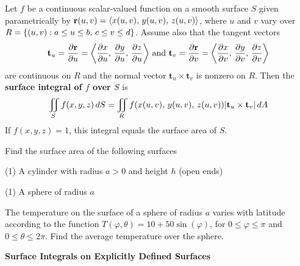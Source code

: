 \documentclass[../mathNotesPreamble]{subfiles}
\begin{document}
  \begin{defn*}
    Let $f$ be a continuous scalar-valued function on a smooth surface $S$ given parametrically by ${\mathbf{r}}(u,v)={\left\langle x(u,v),\,y(u,v),\,z(u,v) \right\rangle}$, where $u$ and $v$ vary over \newline$R={\left\{(u,v): a\leq u\leq b,\, c\leq v\leq d\right\}}$. Assume also that the tangent vectors \newline
      \[\displaystyle \mathbf t_u=\frac{\partial {\mathbf{r}}}{\partial u}={\left\langle \frac{\partial x}{\partial u},\, \frac{\partial y}{\partial u},\, \frac{\partial z}{\partial u} \right\rangle}
      \textnormal{ and }
      \displaystyle\mathbf t_v=\frac{\partial {\mathbf{r}}}{\partial v}={\left\langle \frac{\partial x}{\partial v},\, \frac{\partial y}{\partial v},\, \frac{\partial z}{\partial v} \right\rangle}\]
    are continuous on $R$ and the normal vector $\mathbf t_u\times\mathbf t_v$ is nonzero on $R$. Then the \textbf{surface integral of $f$ over $S$} is 
      \[\iint\limits_S f(x,y,z)\,dS = \iint\limits_R f{\left(x(u,v),\,y(u,v),\,z(u,v)\right)}{\left\vert\mathbf t_u\times\mathbf t_v\right\vert}\,dA\]
    If $f(x,y,z)=1$, this integral equals the surface area of $S$.
  \end{defn*}
  \begin{ex*}
    Find the surface area of the following surfaces
  \end{ex*}
  \begin{tasks}[after-item-skip=\stretch{1}, label=](1)
    \task A cylinder with radius $a>0$ and height $h$ (open ends)
  \end{tasks}
  \pagebreak

  \begin{tasks}[after-item-skip=\stretch{1}, label=, resume](1)
    \task A sphere of radius $a$
  \end{tasks}
  \pagebreak

  \begin{ex*}
    The temperature on the surface of a sphere of radius $a$ varies with latitude according to the function $T(\varphi, \theta)=10+50\sin(\varphi)$, for $0\leq \varphi\leq \pi$ and $0\leq \theta\leq 2\pi$. Find the average temperature over the sphere.
  \end{ex*}
  \pagebreak

  \noindent
  \textbf{Surface Integrals on Explicitly Defined Surfaces}
\end{document}
